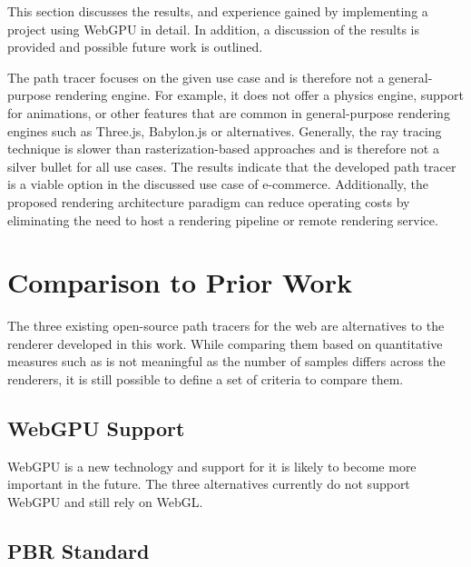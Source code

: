 
This section discusses the results, and experience gained by implementing a project using \gls{WebGPU} in detail. In addition, a discussion of the results is provided and possible future work is outlined.

The path tracer focuses on the given use case and is therefore not a general-purpose rendering engine. For example, it does not offer a physics engine, support for animations, or other features that are common in general-purpose rendering engines such as \gls{Three.js}, \gls{Babylon.js} or alternatives. Generally, the ray tracing technique is slower than rasterization-based approaches and is therefore not a silver bullet for all use cases. The results indicate that the developed path tracer is a viable option in the discussed use case of e-commerce. Additionally, the proposed rendering architecture paradigm can reduce operating costs by eliminating the need to host a rendering pipeline or remote rendering service.

\section{Comparison to Prior Work}
\label{sec:comparisonToPriorWork}

The three existing open-source path tracers for the web are alternatives to the renderer developed in this work. While comparing them based on quantitative measures such as  is not meaningful as the number of samples differs across the renderers, it is still possible to define a set of criteria to compare them.


\subsection*{WebGPU Support}

\gls{WebGPU} is a new technology and support for it is likely to become more important in the future. The three alternatives currently do not support \gls{WebGPU} and still rely on \gls{WebGL}.

\subsection*{PBR Standard}

